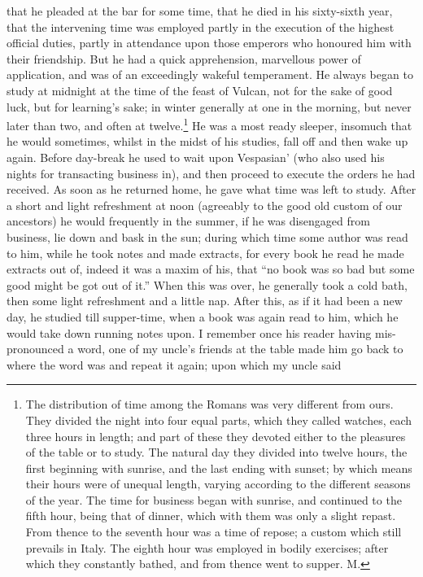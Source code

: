 that he pleaded at the bar for some time, that he died in his sixty-sixth
year, that the intervening time was employed partly in the execution of
the highest official duties, partly in attendance upon those emperors who
honoured him with their friendship. But he had a quick apprehension,
marvellous power of application, and was of an exceedingly wakeful
temperament. He always began to study at midnight at the time of the feast
of Vulcan, not for the sake of good luck, but for learning's sake; in
winter generally at one in the morning, but never later than two, and
often at twelve.\footnote{The distribution of time
among the Romans was very different from ours. They divided the night into
four equal parts, which they called watches, each three hours in length;
and part of these they devoted either to the pleasures of the table or to
study. The natural day they divided into twelve hours, the first beginning
with sunrise, and the last ending with sunset; by which means their hours
were of unequal length, varying according to the different seasons of the
year. The time for business began with sunrise, and continued to the fifth
hour, being that of dinner, which with them was only a slight repast. From
thence to the seventh hour was a time of repose; a custom which still
prevails in Italy. The eighth hour was employed in bodily exercises; after
which they constantly bathed, and from thence went to supper. M.} He was a most ready sleeper, insomuch that he
would sometimes, whilst in the midst of his studies, fall off and then
wake up again. Before day-break he used to wait upon Vespasian' (who also
used his nights for transacting business in), and then proceed to execute
the orders he had received. As soon as he returned home, he gave what time
was left to study. After a short and light refreshment at noon (agreeably
to the good old custom of our ancestors) he would frequently in the
summer, if he was disengaged from business, lie down and bask in the sun;
during which time some author was read to him, while he took notes and
made extracts, for every book he read he made extracts out of, indeed it
was a maxim of his, that ``no book was so bad but some good might be got
out of it.'' When this was over, he generally took a cold bath, then some
light refreshment and a little nap. After this, as if it had been a new
day, he studied till supper-time, when a book was again read to him, which
he would take down running notes upon. I remember once his reader having
mis-pronounced a word, one of my uncle's friends at the table made him go
back to where the word was and repeat it again; upon which my uncle said
